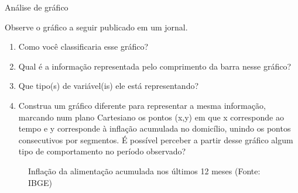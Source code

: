 \label{\detokenize{PE103-2:ativ-4-analise-de-grafico}}
\begin{task}{ Análise de gráfico}

Observe o gráfico a seguir publicado em um jornal.
\begin{enumerate}
\item {} 
Como você classificaria esse gráfico?

\item {} 
Qual é a informação representada pelo comprimento da barra nesse gráfico?

\item {} 
Que tipo(s) de variável(is) ele está representando?

\item {} 
Construa um gráfico diferente para representar a mesma informação, marcando num plano Cartesiano os pontos (x,y) em que x corresponde ao tempo e y corresponde à inflação acumulada no domicílio, unindo os pontos consecutivos por segmentos. É possível perceber a partir desse gráfico algum tipo de comportamento no período observado?

\end{enumerate}
\label{\detokenize{PE103-2:linhaversusbarra}}\begin{figure}[htp]\centering{}\caption{Inflação da alimentação acumulada nos últimos 12 meses (Fonte: IBGE)}\end{figure}\end{task}




